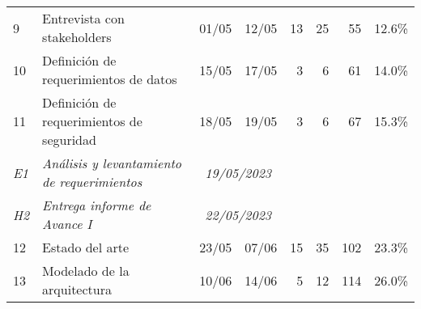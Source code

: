 \begin{longtable}[c]{llccrrrr}
	{\color[HTML]{656565} 9}               & {\color[HTML]{656565} Entrevista con stakeholders}                     & {\color[HTML]{656565} 01/05}                     & {\color[HTML]{656565} 12/05}                     & {\color[HTML]{656565} 13}         & {\color[HTML]{656565} 25}          & {\color[HTML]{656565} 55}            & {\color[HTML]{656565} 12.6\%}       \\
	{\color[HTML]{656565} 10}              & {\color[HTML]{656565} Definición de requerimientos de datos}           & {\color[HTML]{656565} 15/05}                     & {\color[HTML]{656565} 17/05}                     & {\color[HTML]{656565} 3}          & {\color[HTML]{656565} 6}           & {\color[HTML]{656565} 61}            & {\color[HTML]{656565} 14.0\%}       \\
	{\color[HTML]{656565} 11}              & {\color[HTML]{656565} Definición de requerimientos de seguridad}       & {\color[HTML]{656565} 18/05}                     & {\color[HTML]{656565} 19/05}                     & {\color[HTML]{656565} 3}          & {\color[HTML]{656565} 6}           & {\color[HTML]{656565} 67}            & {\color[HTML]{656565} 15.3\%}       \\
	\textit{E1}                            & \textit{Análisis y levantamiento de requerimientos}                    & \multicolumn{2}{c}{\textit{19/05/2023}}          & \textit{}                                        & \textit{}                         & \textit{}                          & \textit{}                                                                  \\
	\textit{H2}                            & \textit{Entrega informe de Avance I}                                   & \multicolumn{2}{c}{\textit{22/05/2023}}          & \textit{}                                        & \textit{}                         & \textit{}                          & \textit{}                                                                  \\
	{\color[HTML]{656565} 12}              & {\color[HTML]{656565} Estado del arte}                                 & \multicolumn{1}{l}{{\color[HTML]{656565} 23/05}} & \multicolumn{1}{l}{{\color[HTML]{656565} 07/06}} & {\color[HTML]{656565} 15}         & {\color[HTML]{656565} 35}          & {\color[HTML]{656565} 102}           & {\color[HTML]{656565} 23.3\%}       \\
	{\color[HTML]{656565} 13}              & {\color[HTML]{656565} Modelado de la arquitectura}                     & \multicolumn{1}{l}{{\color[HTML]{656565} 10/06}} & \multicolumn{1}{l}{{\color[HTML]{656565} 14/06}} & {\color[HTML]{656565} 5}          & {\color[HTML]{656565} 12}          & {\color[HTML]{656565} 114}           & {\color[HTML]{656565} 26.0\%}       \\

\end{longtable}
